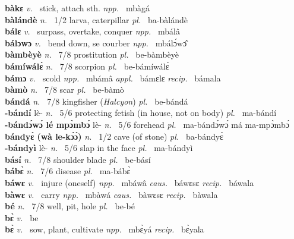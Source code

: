 {\bfseries bàkɛ}  {\itshape v.~} stick, attach sth.   {\itshape npp.~} mbàgá  \\ 
{\bfseries bàlándè} {\itshape n.~} 1/2 larva, caterpillar {\itshape pl.~} ba-bàlándè    \\ 
{\bfseries bálɛ}  {\itshape v.~} surpass, overtake, conquer   {\itshape npp.~} mbálâ  \\ 
{\bfseries bálɔwɔ}  {\itshape v.~} bend down, se courber   {\itshape npp.~} mbálɔ́wɔ̂  \\ 
{\bfseries bàmbèyè}  {\itshape n.~} 7/8 prostitution {\itshape pl.~} be-bàmbèyè    \\ 
{\bfseries bámíwálɛ́}  {\itshape n.~} 7/8 scorpion {\itshape pl.~} be-bámíwálɛ́    \\ 
{\bfseries bámɔ}  {\itshape v.~} scold   {\itshape npp.~} mbámâ {\itshape appl.~} bámɛlɛ {\itshape recip.~} bámala  \\ 
{\bfseries bàmò}  {\itshape n.~} 7/8 scar {\itshape pl.~} be-bàmò    \\ 
{\bfseries bándá}  {\itshape n.~} 7/8 kingfisher ({\itshape Halcyon}) {\itshape pl.~} be-bándá    \\ 
{\bfseries -bándí} lè- {\itshape n.~} 5/6 protecting fetish (in house, not on body) {\itshape pl.~} ma-bándí    \\ 
{\bfseries -bándɔ́wɔ́ lé mpɔ̀mbɔ́} lè- {\itshape n.~} 5/6 forehead {\itshape pl.~} ma-bándɔ́wɔ́ má ma-mpɔ̀mbɔ́    \\ 
{\bfseries bándyɛ̀ (wà le-kɔ́ɔ̀)}  {\itshape n.~} 1/2 cave (of stone) {\itshape pl.~} ba-bándyɛ̀    \\ 
{\bfseries -bándyì} lè- {\itshape n.~} 5/6 slap in the face  {\itshape pl.~} ma-bándyì    \\ 
{\bfseries básí}  {\itshape n.~} 7/8 shoulder blade {\itshape pl.~} be-básí    \\ 
{\bfseries bábɛ̀}  {\itshape n.~} 7/6 disease {\itshape pl.~} ma-bábɛ̀    \\ 
{\bfseries báwɛ}  {\itshape v.~} injure (oneself)   {\itshape npp.~} mbáwâ {\itshape caus.~} báwɛsɛ {\itshape recip.~} báwala  \\ 
{\bfseries bàwɛ}  {\itshape v.~} carry   {\itshape npp.~} mbàwá {\itshape caus.~} bàwɛsɛ {\itshape recip.~} bàwala  \\ 
{\bfseries bé}  {\itshape n.~} 7/8 well, pit, hole {\itshape pl.~} be-bé    \\ 
{\bfseries bɛ̀}  {\itshape v.~} be    \\ 
{\bfseries bɛ̀}  {\itshape v.~} sow, plant, cultivate   {\itshape npp.~} mbɛ̀yá {\itshape recip.~} bɛ̀yala  \\ 

